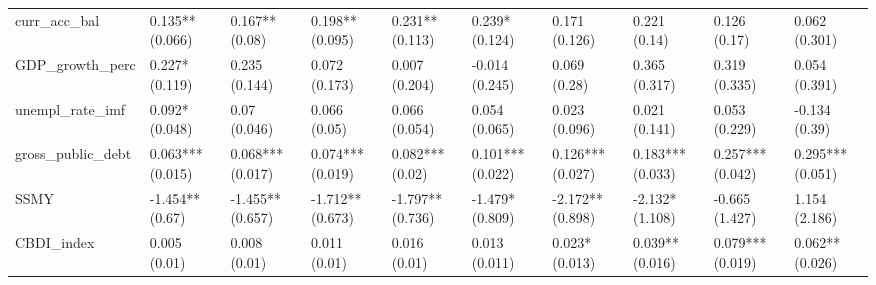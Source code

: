 \begin{table}[ht]
\begin{tabular}{llllllllll}
  curr\_acc\_bal & 0.135** (0.066) & 0.167** (0.08) & 0.198** (0.095) & 0.231** (0.113) & 0.239* (0.124) & 0.171 (0.126) & 0.221 (0.14) & 0.126 (0.17) & 0.062 (0.301) \\ 
  GDP\_growth\_perc & 0.227* (0.119) & 0.235 (0.144) & 0.072 (0.173) & 0.007 (0.204) & -0.014 (0.245) & 0.069 (0.28) & 0.365 (0.317) & 0.319 (0.335) & 0.054 (0.391) \\ 
  unempl\_rate\_imf & 0.092* (0.048) & 0.07 (0.046) & 0.066 (0.05) & 0.066 (0.054) & 0.054 (0.065) & 0.023 (0.096) & 0.021 (0.141) & 0.053 (0.229) & -0.134 (0.39) \\ 
  gross\_public\_debt & 0.063*** (0.015) & 0.068*** (0.017) & 0.074*** (0.019) & 0.082*** (0.02) & 0.101*** (0.022) & 0.126*** (0.027) & 0.183*** (0.033) & 0.257*** (0.042) & 0.295*** (0.051) \\ 
  SSMY & -1.454** (0.67) & -1.455** (0.657) & -1.712** (0.673) & -1.797** (0.736) & -1.479* (0.809) & -2.172** (0.898) & -2.132* (1.108) & -0.665 (1.427) & 1.154 (2.186) \\ 
  CBDI\_index & 0.005 (0.01) & 0.008 (0.01) & 0.011 (0.01) & 0.016 (0.01) & 0.013 (0.011) & 0.023* (0.013) & 0.039** (0.016) & 0.079*** (0.019) & 0.062** (0.026) \\ 
   \bottomrule
\end{tabular}
\endgroup
\end{table}
